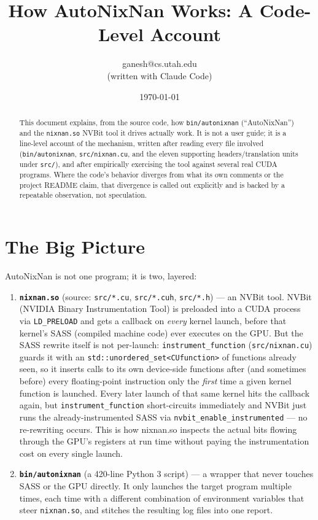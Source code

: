 \documentclass[11pt]{article}
\title{How AutoNixNan Works: A Code-Level Account}
\author{ganesh@cs.utah.edu \\ \small (written with Claude Code)}
\date{\today}
\begin{document}
\maketitle

\begin{abstract}
This document explains, from the source code, how \texttt{bin/autonixnan}
(``AutoNixNan'') and the \texttt{nixnan.so} NVBit tool it drives actually
work. It is not a user guide; it is a line-level account of the
mechanism, written after reading every file involved
(\texttt{bin/autonixnan}, \texttt{src/nixnan.cu}, and the eleven
supporting headers/translation units under \texttt{src/}), and after
empirically exercising the tool against several real CUDA programs. Where
the code's behavior diverges from what its own comments or the project
README claim, that divergence is called out explicitly and is backed by
a repeatable observation, not speculation.
\end{abstract}

\tableofcontents

\section{The Big Picture}

AutoNixNan is not one program; it is two, layered:

\begin{enumerate}
\item \textbf{\texttt{nixnan.so}} (source: \texttt{src/*.cu}, \texttt{src/*.cuh},
  \texttt{src/*.h}) --- an NVBit tool. NVBit (NVIDIA Binary Instrumentation
  Tool) is preloaded into a CUDA process via \texttt{LD\_PRELOAD} and gets
  a callback on \emph{every} kernel launch, before that kernel's SASS
  (compiled machine code) ever executes on the GPU. But the SASS rewrite
  itself is not per-launch: \texttt{instrument\_function} (\texttt{src/nixnan.cu})
  guards it with an \texttt{std::unordered\_set<CUfunction>} of functions
  already seen, so it inserts calls to its own device-side functions after
  (and sometimes before) every floating-point instruction only the
  \emph{first} time a given kernel function is launched. Every later
  launch of that same kernel hits the callback again, but
  \texttt{instrument\_function} short-circuits immediately and NVBit just
  runs the already-instrumented SASS via \texttt{nvbit\_enable\_instrumented}
  --- no re-rewriting occurs. This is how nixnan.so inspects the actual
  bits flowing through the GPU's registers at run time without paying the
  instrumentation cost on every single launch.
\item \textbf{\texttt{bin/autonixnan}} (a 420-line Python 3 script) --- a
  wrapper that never touches SASS or the GPU directly. It only launches
  the target program multiple times, each time with a different
  combination of environment variables that steer \texttt{nixnan.so},
  and stitches the resulting log files into one report.
\end{enumerate}
\end{document}
